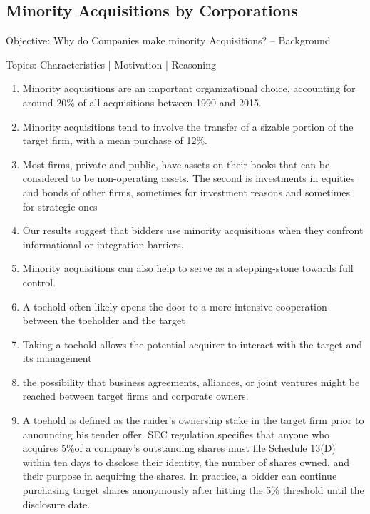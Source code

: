 \documentclass[12pt]{article}
\begin{document}
\subsection{Minority Acquisitions by Corporations} 
\begin{center}
Objective: Why do Companies make minority Acquisitions? -- Background
\end{center} 
Topics: Characteristics | Motivation | Reasoning 
    \begin{enumerate}

        \item Minority acquisitions are an important organizational choice, accounting for around 20\% of all acquisitions between 1990 and 2015.\citep{Huang2017}
        \item Minority acquisitions tend to involve the transfer of a sizable portion of the target firm, with a mean purchase of 12\%. \citep{Ouimet2013}
        \item Most firms, private and public, have assets on their books that can be considered to be non-operating assets. The second is investments in equities and bonds of other firms, sometimes for investment reasons and sometimes for strategic ones \citep{Damodaran2005}

        \item Our results suggest that bidders use minority acquisitions when they confront informational or integration barriers. \citep{Huang2017}
        \item Minority acquisitions can also help to serve as a stepping-stone towards full control. \citep{Huang2017}
        \item A toehold often likely opens the door to a more intensive cooperation between the toeholder and the target \citep{Povel2014}
        \item Taking a toehold allows the potential acquirer to interact with the target and its management \citep{Povel2014}
        \item the possibility that business agreements, alliances, or joint ventures might be reached between target firms and corporate owners. \citep{Allen2000}


        \item A toehold is defined as the raider’s ownership stake in the target firm prior to announcing his tender offer. SEC regulation specifies that anyone who acquires 5\%of a company’s outstanding shares must file Schedule 13(D) within ten days to disclose their identity, the number of shares owned, and their purpose in acquiring the shares. In practice, a bidder can continue purchasing target shares anonymously after hitting the 5\% threshold until the disclosure date. \citep{Goldman2005}

    \end{enumerate}
\end{document}
